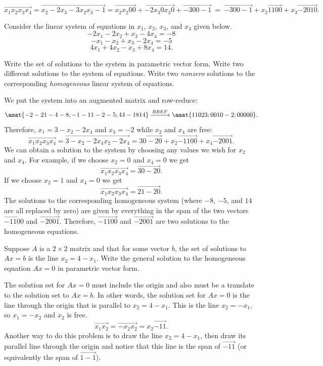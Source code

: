 \begin{problems}
\begin{solution}
      \[\vec{x_1 x_2 x_3 x_4} = \vec{x_2-2x_3-3 x_2 x_3 -1}
        = \vec{x_2 x_2 0 0} + \vec{-2x_3 0 x_3 0} + \vec{-3 0 0 -1} \
        = \ \boxed{\vec{-3 0 0 -1} + x_2 \vec{1 1 0 0} + x_3 \vec{-2
          0 1 0}}.\]
\end{solution}

\problem Consider the linear system of equations in $x_1$, $x_2$,
$x_3$, and $x_4$ given below.
\[-2x_1 - 2x_2 + x_3 - 4x_4 = -8\]
\[-x_1 - x_2 + x_3 - 2x_4 = -5\]
\[4x_1 + 4x_2 - x_3 + 8x_4 = 14.\]
\begin{subproblems}
  \subproblem Write the set of solutions to the system in parametric
  vector form.
  \subproblem Write two different solutions to the system of equations.
  \subproblem Write two \emph{nonzero} solutions to the corresponding
  \emph{homogeneous} linear system of equations.
\end{subproblems}
\begin{solution}
\begin{subproblems}
  \subproblem We put the system into an augmented matrix and
  row-reduce:
  \[\amat{-2 -2 1 -4 -8; -1 -1 1 -2 -5; 4 4 -1 8 14}
    \xrightarrow[]{RREF}
    \amat{1 1 0 2 3; 0 0 1 0 -2; 0 0 0 0 0}.\]
  Therefore, $x_1 = 3 - x_2 - 2x_4$ and $x_3 = -2$ while $x_2$ and
  $x_4$ are free:
  \[\vec{x_1 x_2 x_3 x_4} = \vec{3-x_2-2x_4 x_2 -2 x_4}
    = \boxed{\vec{3 0 -2 0} + x_2 \vec{-1 1 0 0} + x_4 \vec{-2 0 0 1}}.
  \]
  \subproblem We can obtain a solution to the system by choosing any
  values we wish for $x_2$ and $x_4$.  For example, if we choose $x_2 = 0$
  and $x_4 = 0$ we get
  \[\vec{x_1 x_2 x_3 x_4} = \vec{3 0 -2 0}.\]
  If we choose $x_2 = 1$ and $x_4 = 0$ we get
  \[\vec{x_1 x_2 x_3 x_4} = \vec{2 1 -2 0}.\]
  \subproblem The solutions to the corresponding homogeneous system
  (where $-8$, $-5$, and $14$ are all replaced by zero) are given by
  everything in the span of the two vectors $\vec{-1 1 0 0}$ and
  $\vec{-2 0 0 1}$.  Therefore, $\vec{-1 1 0 0}$ and $\vec{-2 0 0 1}$
  are two solutions to the homogeneous equations.
\end{subproblems}  
\end{solution}


\problem %
Suppose $A$ is a $2 \times 2$ matrix and that for some vector $b$, the
set of solutions to $Ax = b$ is the line $x_2 = 4-x_1$.  Write the
general solution to the homogeneous equation $Ax=0$ in parametric
vector form.

\begin{solution}
  The solution set for $Ax = 0$ must include the origin and also must
  be a translate to the solution set to $Ax = b$.  In other words,
  the solution set for $Ax = 0$ is the line through the origin that
  is parallel to $x_2 = 4-x_1$.  This is the line $x_2 = -x_1$,
  so $x_1 = -x_2$ and $x_2$ is free.
  \[\vec{x_1 x_2} = \vec{-x_2 x_2} = x_2 \vec{-1 1}.\]
  Another way to do this problem is to draw the line $x_2 = 4-x_1$,
  then draw its parallel line through the origin and notice that this
  line is the span of $\vec{-1 1}$ (or equivalently the span of
  $\vec{1 -1}$).
\end{solution}


\end{problems}
